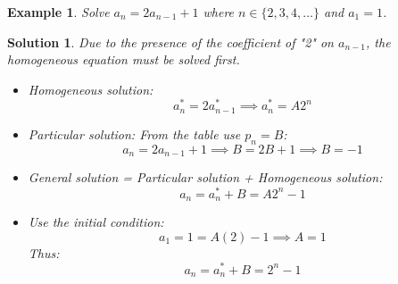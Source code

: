 \documentclass[12pt, letterpaper, onecolumn, conference, final]{IEEEtran}
\theoremstyle{definition}
\theoremstyle{plain}
\newtheorem{example}{Example}[section]
\newtheorem{solution}{Solution}[section]
\begin{document}
\begin{example}
Solve $a_n=2a_{n-1}+1$ where $n \in \{2,3,4,\dots\}$ and $a_1=1$.
\end{example}
\begin{solution}
Due to the presence of the coefficient of "2" on $a_{n-1}$, the homogeneous equation must be solved first.
\begin{itemize}

\vspace{.2cm}
\item[(1)]
Homogeneous solution:
\begin{equation*}
a_n^* = 2a_{n-1}^* \implies a_n^* = A2^n
\end{equation*}

\vspace{.2cm}
\item[(2)]
Particular solution: From the table use $p_n = B$:
\begin{equation*}
a_n = 2a_{n-1} + 1 \implies B = 2B + 1 \implies B = -1
\end{equation*}

\vspace{.2cm}
\item[(3)]
General solution = Particular solution + Homogeneous solution:
\begin{equation*}
a_n = a_n^* + B = A2^n - 1
\end{equation*}

\vspace{.2cm}
\item[(4)]
Use the initial condition:
\begin{equation*}
a_1 = 1 = A(2) - 1 \implies A = 1
\end{equation*}
Thus:
\begin{equation*}
a_n = a_n^* + B = 2^n - 1
\end{equation*}

\end{itemize}
\end{solution}
\end{document}
